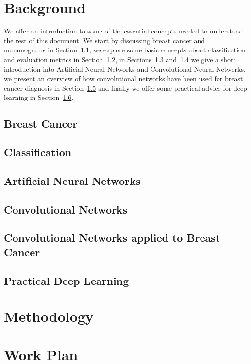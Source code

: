 \documentclass[11pt]{article}
\begin{document}
\section{Background}
\label{sec:Background}
We offer an introduction to some of the essential concepts needed to understand the rest of this document. We start by discussing breast cancer and mammograms in Section~\ref{subsec:BreastCancer}, we explore some basic concepts about classification and evaluation metrics in Section~\ref{subsec:Classification}, in Sections~\ref{subsec:ANNs} and~\ref{subsec:ConvNets} we give a short introduction into Artificial Neural Networks and Convolutional Neural Networks, we present an overview of how convolutional networks have been used for breast cancer diagnosis in Section~\ref{subsec:BreastCancerConvNets} and finally we offer some practical advice for deep learning in Section~\ref{subsec:PracticalDL}.

	\subsection{Breast Cancer}
	\label{subsec:BreastCancer}
	

	\subsection{Classification}
	\label{subsec:Classification}
	

	\subsection{Artificial Neural Networks}
	\label{subsec:ANNs}
	

	\subsection{Convolutional Networks}
	\label{subsec:ConvNets}
	

	\subsection{Convolutional Networks applied to Breast Cancer}
	\label{subsec:BreastCancerConvNets}
	

	\subsection{Practical Deep Learning}
	\label{subsec:PracticalDL}
	

\section{Methodology}
\label{sec:Methodology}


\section{Work Plan}
\label{sec:WorkPlan}




\end{document}
